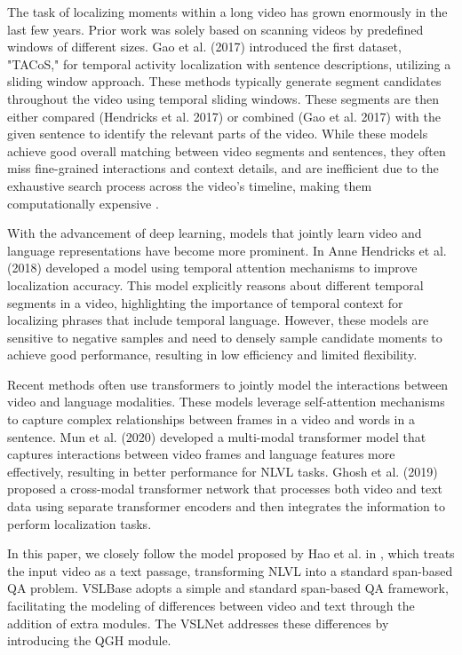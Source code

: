 \documentclass[conference]{IEEEtran}
\begin{document}
The task of localizing moments within a long video has grown enormously in the last few years. Prior work was solely based on scanning videos by predefined windows of different sizes. Gao et al. (2017) introduced the first dataset, "TACoS," for temporal activity localization with sentence descriptions, utilizing a sliding window approach. These methods typically generate segment candidates throughout the video using temporal sliding windows. These segments are then either compared (Hendricks et al. 2017) or combined (Gao et al. 2017) with the given sentence to identify the relevant parts of the video. While these models achieve good overall matching between video segments and sentences, they often miss fine-grained interactions and context details, and are inefficient due to the exhaustive search process across the video's timeline, making them computationally expensive \cite{b4}.

With the advancement of deep learning, models that jointly learn video and language representations have become more prominent. In \cite{b5} Anne Hendricks et al. (2018) developed a model using temporal attention mechanisms to improve localization accuracy. This model explicitly reasons about different temporal segments in a video, highlighting the importance of temporal context for localizing phrases that include temporal language. However, these models are sensitive to negative samples and need to densely sample candidate moments to achieve good performance, resulting in low efficiency and limited flexibility.

Recent methods often use transformers to jointly model the interactions between video and language modalities. These models leverage self-attention mechanisms to capture complex relationships between frames in a video and words in a sentence. Mun et al. (2020) developed a multi-modal transformer model that captures interactions between video frames and language features more effectively, resulting in better performance for NLVL tasks. Ghosh et al. (2019) proposed a cross-modal transformer network that processes both video and text data using separate transformer encoders and then integrates the information to perform localization tasks.

In this paper, we closely follow the model proposed by Hao et al. in \cite{b3}, which treats the input video as a text passage, transforming NLVL into a standard span-based QA problem. VSLBase adopts a simple and standard span-based QA framework, facilitating the modeling of differences between video and text through the addition of extra modules. The VSLNet addresses these differences by introducing the QGH module.
\end{document}

